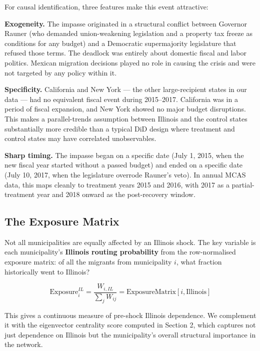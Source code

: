 \documentclass[
  11pt,
  letterpaper,
  DIV=11,
  numbers=noendperiod]{scrartcl}
\begin{document}
For causal identification, three features make this event attractive:

\textbf{Exogeneity.} The impasse originated in a structural conflict
between Governor Rauner (who demanded union-weakening legislation and a
property tax freeze as conditions for any budget) and a Democratic
supermajority legislature that refused those terms. The deadlock was
entirely about domestic fiscal and labor politics. Mexican migration
decisions played no role in causing the crisis and were not targeted by
any policy within it.

\textbf{Specificity.} California and New York --- the other
large-recipient states in our data --- had no equivalent fiscal event
during 2015--2017. California was in a period of fiscal expansion, and
New York showed no major budget disruptions. This makes a
parallel-trends assumption between Illinois and the control states
substantially more credible than a typical DiD design where treatment
and control states may have correlated unobservables.

\textbf{Sharp timing.} The impasse began on a specific date (July 1,
2015, when the new fiscal year started without a passed budget) and
ended on a specific date (July 10, 2017, when the legislature overrode
Rauner's veto). In annual MCAS data, this maps cleanly to treatment
years 2015 and 2016, with 2017 as a partial-treatment year and 2018
onward as the post-recovery window.

\subsection{The Exposure Matrix}\label{the-exposure-matrix}

Not all municipalities are equally affected by an Illinois shock. The
key variable is each municipality's \textbf{Illinois routing
probability} from the row-normalised exposure matrix: of all the
migrants from municipality \(i\), what fraction historically went to
Illinois?

\[\text{Exposure}_i^{IL} = \frac{W_{i,IL}}{\sum_j W_{ij}} = \text{ExposureMatrix}[i, \text{Illinois}]\]

This gives a continuous measure of pre-shock Illinois dependence. We
complement it with the eigenvector centrality score computed in Section
2, which captures not just dependence on Illinois but the municipality's
overall structural importance in the network.
\end{document}
